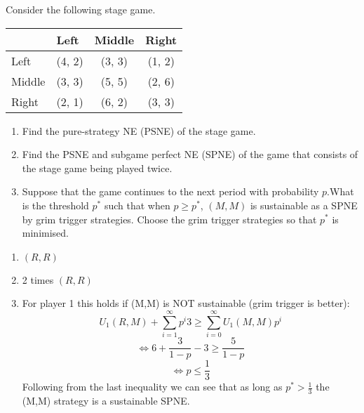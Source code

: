 \documentclass[../main.tex]{subfiles}
\begin{document}
\begin{question}
  Consider the following stage game.
    \begin{table}[h]
    \centering
\begin{tabular}{lccc}
                            & \multicolumn{1}{l}{Left} & \multicolumn{1}{l}{Middle} & \multicolumn{1}{l}{Right} \\ \hline
\multicolumn{1}{l|}{Left}   & (4, 2)                   & (3, 3)                     & (1, 2)                    \\
\multicolumn{1}{l|}{Middle} & (3, 3)                   & (5, 5)                     & (2, 6)                    \\
\multicolumn{1}{l|}{Right}  & (2, 1)                   & (6, 2)                     & (3, 3)                   
\end{tabular}
\end{table}

\begin{enumerate}
  \item Find the pure-strategy NE (PSNE) of the stage game.
  \item Find the PSNE and subgame perfect NE (SPNE) of the game that consists of the stage game being played twice.
  \item Suppose that the game continues to the next period with probability $p$.What is the threshold $p^*$ such that when $p \geq p^*$, $(M,M)$ is sustainable as a SPNE by grim trigger strategies. Choose the grim trigger strategies so that $p^*$ is minimised.
\end{enumerate}

\end{question}

\begin{solution}

\begin{enumerate}
  \item $(R,R)$
  \item 2 times $(R,R)$
  \item For player 1 this holds if (M,M) is NOT sustainable (grim trigger is better):
$$U_1 (R,M) + \sum\limits_{i=1}^{\infty} p^i 3 \geq \sum\limits_{i=0}^{\infty} U_1 (M,M) p^i$$
$$\Leftrightarrow 6 + \frac{3}{1-p} - 3 \geq \frac{5}{1-p}$$
$$\Leftrightarrow p \leq \frac{1}{3}$$
Following from the last inequality we can see that as long as $p^* > \frac{1}{3}$ the (M,M) strategy is a sustainable SPNE.

\end{enumerate}

\end{solution}
\end{document}
